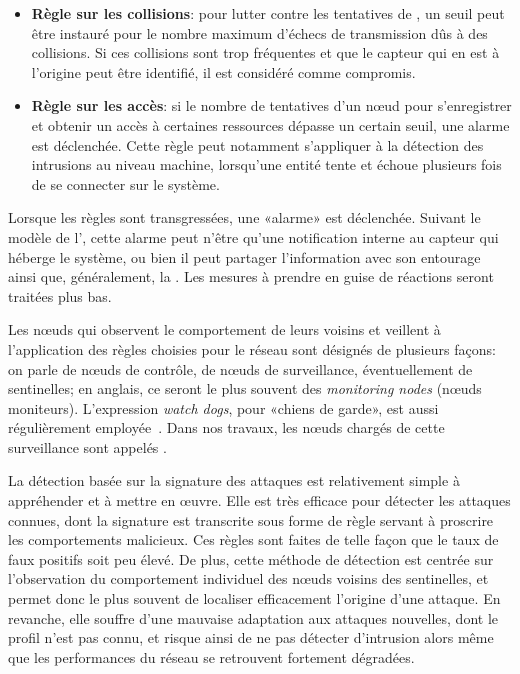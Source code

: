 \begin{itemize}
    \item \textbf{Règle sur les collisions}: pour lutter contre les tentatives de , un seuil peut être instauré pour le nombre maximum d'échecs de transmission dûs à des collisions. Si ces collisions sont trop fréquentes et que le capteur qui en est à l'origine peut être identifié, il est considéré comme compromis.
    \item \textbf{Règle sur les accès}: si le nombre de tentatives d'un nœud pour s'enregistrer et obtenir un accès à certaines ressources dépasse un certain seuil, une alarme est déclenchée. Cette règle peut notamment s'appliquer à la détection des intrusions au niveau machine, lorsqu'une entité tente et échoue plusieurs fois de se connecter sur le système.
\end{itemize}

Lorsque les règles sont transgressées, une «alarme» est déclenchée.
Suivant le modèle de l'\IDS, cette alarme peut n'être qu'une notification interne au capteur qui héberge le système, ou bien il peut partager l'information avec son entourage ainsi que, généralement, la \sdb.
Les mesures à prendre en guise de réactions seront traitées plus bas.

Les nœuds qui observent le comportement de leurs voisins et veillent à l'application des règles choisies pour le réseau sont désignés de plusieurs façons: on parle de nœuds de contrôle, de nœuds de surveillance, éventuellement de sentinelles; en anglais, ce seront le plus souvent des \textit{monitoring nodes} (nœuds moniteurs).
L'expression \textit{watch dogs}, pour «chiens de garde», est aussi régulièrement employée~\cite{RKKK13}.
Dans nos travaux, les nœuds chargés de cette surveillance sont appelés \cns.

La détection basée sur la signature des attaques est relativement simple à appréhender et à mettre en œuvre.
Elle est très efficace pour détecter les attaques connues, dont la signature est transcrite sous forme de règle servant à proscrire les comportements malicieux.
Ces règles sont faites de telle façon que le taux de faux positifs soit peu élevé.
De plus, cette méthode de détection est centrée sur l'observation du comportement individuel des nœuds voisins des sentinelles, et permet donc le plus souvent de localiser efficacement l'origine d'une attaque.
En revanche, elle souffre d'une mauvaise adaptation aux attaques nouvelles, dont le profil n'est pas connu, et risque ainsi de ne pas détecter d'intrusion alors même que les performances du réseau se retrouvent fortement dégradées.

